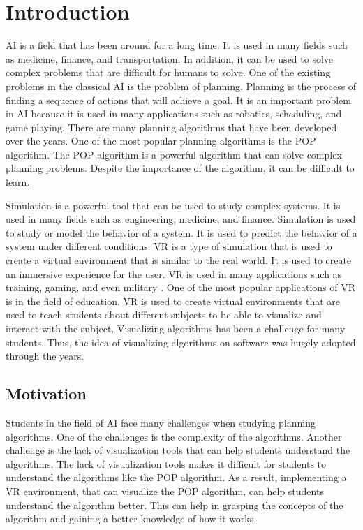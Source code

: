 \chapter{Introduction}
\label{chap:intro}

\ac{AI} is a field that has been around for a long time. It is used in many fields such as medicine, finance, and transportation. In addition, it can be used to solve complex problems that are difficult for humans to solve. One of the existing problems in the classical \ac{AI} is the problem of planning. Planning is the process of finding a sequence of actions that will achieve a goal. It is an important problem in \ac{AI} because it is used in many applications such as robotics, scheduling, and game playing. There are many planning algorithms that have been developed over the years. One of the most popular planning algorithms is the \ac{POP} algorithm. The \ac{POP} algorithm is a powerful algorithm that can solve complex planning problems. Despite the importance of the algorithm, it can be difficult to learn.

Simulation is a powerful tool that can be used to study complex systems. It is used in many fields such as engineering, medicine, and finance. Simulation is used to study or model the behavior of a system. It is used to predict the behavior of a system under different conditions. \ac{VR} is a type of simulation that is used to create a virtual environment that is similar to the real world. It is used to create an immersive experience for the user. \ac{VR} is used in many applications such as training, gaming, and even military \cite{WikiVR}. One of the most popular applications of \ac{VR} is in the field of education. \ac{VR} is used to create virtual environments that are used to teach students about different subjects to be able to visualize and interact with the subject. Visualizing algorithms has been a challenge for many students. Thus, the idea of visualizing algorithms on software was hugely adopted through the years.

\section{Motivation}

Students in the field of \ac{AI} face many challenges when studying planning algorithms. One of the challenges is the complexity of the algorithms. Another challenge is the lack of visualization tools that can help students understand the algorithms. The lack of visualization tools makes it difficult for students to understand the algorithms like the \ac{POP} algorithm. As a result, implementing a \ac{VR} environment, that can visualize the \ac{POP} algorithm, can help students understand the algorithm better. This can help in grasping the concepts of the algorithm and gaining a better knowledge of how it works.

